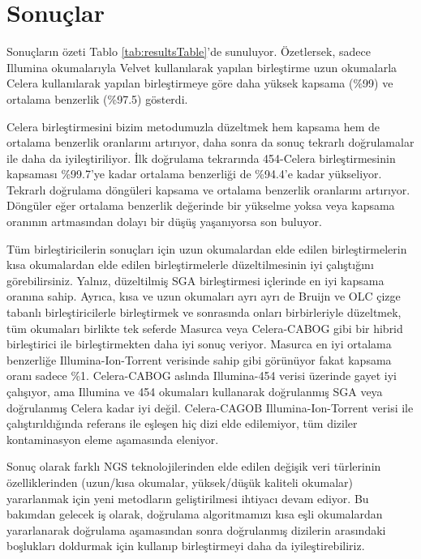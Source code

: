 \documentclass[12pt,a4paper]{cibb}
\begin{document}
\section{\bf Sonuçlar}
\label{bac_pinar_sonuc}
Sonuçların özeti Tablo \ref{tab:resultsTable}'de sunuluyor. 
Özetlersek, sadece Illumina okumalarıyla Velvet kullanılarak yapılan birleştirme uzun okumalarla Celera kullanılarak yapılan birleştirmeye göre daha yüksek kapsama (\%99) ve ortalama benzerlik (\%97.5) gösterdi.

Celera birleştirmesini bizim metodumuzla düzeltmek hem kapsama hem de ortalama benzerlik oranlarını artırıyor, daha sonra da sonuç tekrarlı doğrulamalar ile daha da iyileştiriliyor.
İlk doğrulama tekrarında 454-Celera birleştirmesinin kapsaması \%99.7'ye kadar ortalama benzerliği de \%94.4'e kadar yükseliyor. 
Tekrarlı doğrulama döngüleri kapsama ve ortalama benzerlik oranlarını artırıyor. 
Döngüler eğer ortalama benzerlik değerinde bir yükselme yoksa veya kapsama oranının artmasından dolayı bir düşüş yaşanıyorsa son buluyor. 

Tüm birleştiricilerin sonuçları için uzun okumalardan elde edilen birleştirmelerin kısa okumalardan elde edilen birleştirmelerle düzeltilmesinin iyi çalıştığını görebilirsiniz. 
Yalnız, düzeltilmiş SGA birleştirmesi içlerinde en iyi kapsama oranına sahip.
Ayrıca, kısa ve uzun okumaları ayrı ayrı de Bruijn ve OLC çizge tabanlı birleştiricilerle birleştirmek ve sonrasında onları birbirleriyle düzeltmek, tüm okumaları birlikte tek seferde Masurca veya Celera-CABOG gibi bir hibrid birleştirici ile birleştirmekten daha iyi sonuç veriyor. Masurca en iyi ortalama benzerliğe Illumina-Ion-Torrent verisinde sahip gibi görünüyor fakat kapsama oranı sadece \%1. 
Celera-CABOG aslında Illumina-454 verisi üzerinde gayet iyi çalışıyor, ama Illumina ve 454 okumaları kullanarak doğrulanmış SGA veya doğrulanmış Celera kadar iyi değil. 
Celera-CAGOB Illumina-Ion-Torrent verisi ile çalıştırıldığında referans ile eşleşen hiç dizi elde edilemiyor, tüm diziler kontaminasyon eleme aşamasında eleniyor.

Sonuç olarak farklı NGS teknolojilerinden elde edilen değişik veri türlerinin özelliklerinden (uzun/kısa okumalar, yüksek/düşük kaliteli okumalar) yararlanmak için yeni metodların geliştirilmesi ihtiyacı devam ediyor. 
Bu bakımdan gelecek iş olarak, doğrulama algoritmamızı kısa eşli okumalardan yararlanarak doğrulama aşamasından sonra doğrulanmış dizilerin arasındaki boşlukları doldurmak için kullanıp birleştirmeyi daha da iyileştirebiliriz.
\end{document}
